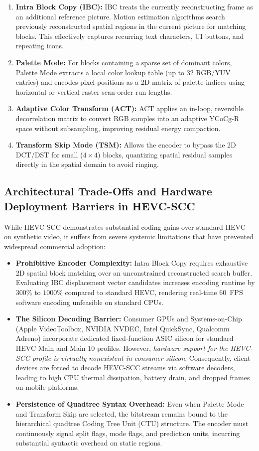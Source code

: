 \begin{enumerate}
    \item \textbf{Intra Block Copy (IBC):} IBC treats the currently reconstructing frame as an additional reference picture. Motion estimation algorithms search previously reconstructed spatial regions in the current picture for matching blocks. This effectively captures recurring text characters, UI buttons, and repeating icons.
    \item \textbf{Palette Mode:} For blocks containing a sparse set of dominant colors, Palette Mode extracts a local color lookup table (up to 32 RGB/YUV entries) and encodes pixel positions as a 2D matrix of palette indices using horizontal or vertical raster scan-order run lengths.
    \item \textbf{Adaptive Color Transform (ACT):} ACT applies an in-loop, reversible decorrelation matrix to convert RGB samples into an adaptive YCoCg-R space without subsampling, improving residual energy compaction.
    \item \textbf{Transform Skip Mode (TSM):} Allows the encoder to bypass the 2D DCT/DST for small ($4\times 4$) blocks, quantizing spatial residual samples directly in the spatial domain to avoid ringing.
\end{enumerate}

\subsection{Architectural Trade-Offs and Hardware Deployment Barriers in HEVC-SCC}
While HEVC-SCC demonstrates substantial coding gains over standard HEVC on synthetic video, it suffers from severe systemic limitations that have prevented widespread commercial adoption:
\begin{itemize}
    \item \textbf{Prohibitive Encoder Complexity:} Intra Block Copy requires exhaustive 2D spatial block matching over an unconstrained reconstructed search buffer. Evaluating IBC displacement vector candidates increases encoding runtime by $300\%$ to $1000\%$ compared to standard HEVC, rendering real-time 60~FPS software encoding unfeasible on standard CPUs.
    \item \textbf{The Silicon Decoding Barrier:} Consumer GPUs and Systems-on-Chip (Apple VideoToolbox, NVIDIA NVDEC, Intel QuickSync, Qualcomm Adreno) incorporate dedicated fixed-function ASIC silicon for standard HEVC Main and Main 10 profiles. However, \textit{hardware support for the HEVC-SCC profile is virtually nonexistent in consumer silicon}. Consequently, client devices are forced to decode HEVC-SCC streams via software decoders, leading to high CPU thermal dissipation, battery drain, and dropped frames on mobile platforms.
    \item \textbf{Persistence of Quadtree Syntax Overhead:} Even when Palette Mode and Transform Skip are selected, the bitstream remains bound to the hierarchical quadtree Coding Tree Unit (CTU) structure. The encoder must continuously signal split flags, mode flags, and prediction units, incurring substantial syntactic overhead on static regions.
\end{itemize}

